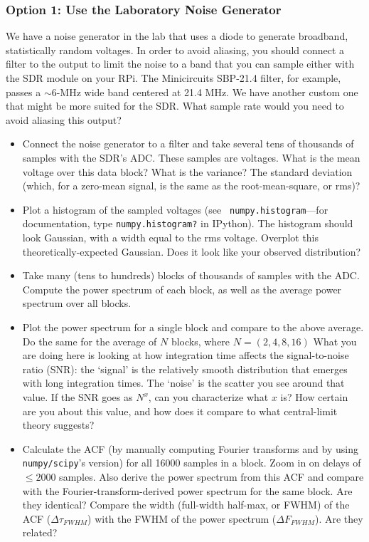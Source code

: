 \documentclass[11pt,preprint]{aastex}
\begin{document}
\subsubsection{Option 1: Use the Laboratory Noise Generator}

\noindent
We have a noise generator in the lab that uses a diode to generate broadband,
statistically random voltages. In order to avoid aliasing, you should connect
a filter to the output to limit the noise to a band that you can sample either
with the SDR module on your RPi. The 
Minicircuits SBP-21.4 filter, for example, passes a $\sim 6$-MHz wide band centered
at 21.4 MHz. We have another custom one that might be more suited for the SDR.
What sample rate would you need to avoid aliasing this output? 

\begin{itemize}

\item Connect the noise generator to a 
  filter and take several tens of thousands of samples
  with the SDR's ADC.
  These samples are voltages. What is the
  mean voltage over this data block?
  What is the variance? The standard deviation (which, for a zero-mean signal,
  is the same as the root-mean-square, or rms)?

\item Plot a histogram of the sampled voltages (see {\tt
  numpy.histogram}---for documentation, type {\tt numpy.histogram?} in IPython).
  The histogram
  should look Gaussian, with a width equal to the rms
  voltage. Overplot this theoretically-expected Gaussian. Does it look
  like your observed distribution?

\item Take many (tens to hundreds) blocks of thousands of samples with the ADC. 
  Compute the power spectrum
  of each block, as well as the average power spectrum over all blocks.

\item Plot the power spectrum for a single block and compare to the
  above average. Do the same for the average of $N$ blocks, where $N=(2,
  4, 8, 16)$ What you are doing here is looking at how integration time
  affects the signal-to-noise ratio (SNR): the `signal' is the relatively
  smooth distribution that emerges with long integration times.
  The `noise' is the scatter you see around that value. If the SNR goes as
  $N^x$, can you characterize what $x$ is? How certain are you about this value, and
  how does it compare to what central-limit theory suggests?

\item Calculate the ACF (by manually computing Fourier transforms and by using \verb$numpy/scipy$'s version)
  for all
  16000 samples in a block. Zoom in on delays of $\le 2000$ samples. Also derive the power
  spectrum from this ACF and compare with the Fourier-transform-derived power
  spectrum for the same block.  Are they identical?
  Compare the width (full-width half-max, or FWHM) of the ACF ($\Delta
  \tau_{FWHM}$) with the FWHM of the power spectrum ($\Delta
  F_{FWHM}$). Are they related?

\end{itemize}
\end{document}
